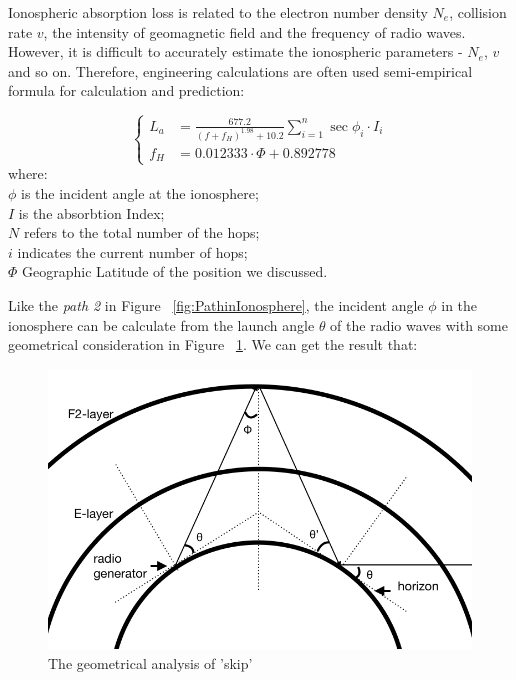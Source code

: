 \documentclass{mcmthesis}
\begin{document}
    Ionospheric absorption loss is related to the electron number density $N_{e}$, collision rate $v$, the intensity of geomagnetic field and the frequency of radio waves. However, it is difficult to accurately estimate the ionospheric parameters - $N_{e}$, $v$ and so on. Therefore, engineering calculations are often used semi-empirical formula for calculation and prediction\cite{terman1943radio}:

     \begin{equation}\label{eq:IonosphereLoss}
     \left\{
      \begin{aligned}
      L_{a} &= \frac{677.2}{(f + f_{H})^{1.98} + 10.2}\sum_{i = 1}^{n}\sec\phi_{i} \cdot I_{i}\\
      f_{H} &= 0.012333 \cdot \Phi + 0.892778
      \end{aligned}
      \right.
     \end{equation}
     where:\\
     $\phi$ is the incident angle at the ionosphere;\\
     $I$ is the absorbtion Index;\\
     $N$ refers to the total number of the hops;\\
     $i$ indicates the current number of hops;\\
     $\Phi$ Geographic Latitude of the position we discussed.

    Like the \emph{path 2} in Figure ~\ref{fig:PathinIonosphere}, the incident angle $\phi$ in the ionosphere can be calculate from the launch angle $\theta$ of the radio waves with some geometrical consideration in Figure ~\ref{fig:Multi_hop_angle}. We can get the result that:

    \begin{figure}[h]
    \centering
    \includegraphics[scale=0.4]{Multi_hop_angle}
    \caption{The geometrical analysis of 'skip' }
    \label{fig:Multi_hop_angle}
    \end{figure}
\end{document}
